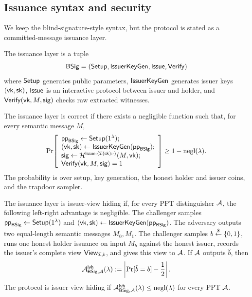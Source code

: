 \subsection{Issuance syntax and security}
\label{subsec:blind-sig-defs}
We keep the blind-signature-style syntax, but the protocol is stated as a committed-message issuance layer.

\begin{definition}\label{def:bs-syntax}
The issuance layer is a tuple
\[
  \mathsf{BSig}=(\mathsf{Setup},\mathsf{IssuerKeyGen},\mathsf{Issue},\mathsf{Verify})
\]
where \(\mathsf{Setup}\) generates public parameters, \(\mathsf{IssuerKeyGen}\) generates issuer keys \((\mathsf{vk},\mathsf{sk})\), \(\mathsf{Issue}\) is an
interactive protocol between issuer and holder, and \(\mathsf{Verify}(\mathsf{vk},M,\mathsf{sig})\) checks raw extracted witnesses.
\end{definition}

\begin{definition}\label{def:bs-correctness}
The issuance layer is correct if there exists a negligible function such that, for every semantic message \(M\),
\[
\Pr\!\left[
\begin{array}{l}
  \mathsf{pp}_{\mathsf{BSig}}\gets \mathsf{Setup}(1^\lambda);\\
  (\mathsf{vk},\mathsf{sk})\gets \mathsf{IssuerKeyGen}(\mathsf{pp}_{\mathsf{BSig}});\\
  \mathsf{sig}\gets \mathcal{H}^{\mathsf{Issue}:\langle\mathcal{I}(\mathsf{sk}):\cdot\rangle}(M,\mathsf{vk});\\
  \mathsf{Verify}(\mathsf{vk},M,\mathsf{sig})=1
\end{array}
\right]
\ge 1-\mathrm{negl}(\lambda).
\]
The probability is over setup, key generation, the honest holder and issuer coins, and the trapdoor sampler.
\end{definition}

\begin{definition}\label{def:bs-blindness}
The issuance layer is issuer-view hiding if, for every PPT distinguisher \(\mathcal{A}\), the following left-right advantage
is negligible.  The challenger samples \(\mathsf{pp}_{\mathsf{BSig}}\gets\mathsf{Setup}(1^\lambda)\) and
\((\mathsf{vk},\mathsf{sk})\gets\mathsf{IssuerKeyGen}(\mathsf{pp}_{\mathsf{BSig}})\).  The adversary outputs two equal-length semantic messages
\(M_0,M_1\).  The challenger samples \(b\overset{\$}{\leftarrow}\{0,1\}\), runs one honest holder issuance on input \(M_b\)
against the honest issuer, records the issuer's complete view \(\mathsf{View}_{\mathcal{I},b}\), and gives this view to
\(\mathcal{A}\).  If \(\mathcal{A}\) outputs \(\hat b\), then
\[
  \mathcal{A}^{\mathsf{ivh}}_{\mathsf{BSig},\mathcal{A}}(\lambda)
  :=
  \left|\Pr[\hat b=b]-\frac12\right|.
\]
The protocol is issuer-view hiding if \(\mathcal{A}^{\mathsf{ivh}}_{\mathsf{BSig},\mathcal{A}}(\lambda)\le\mathrm{negl}(\lambda)\) for every
PPT \(\mathcal{A}\).
\end{definition}

